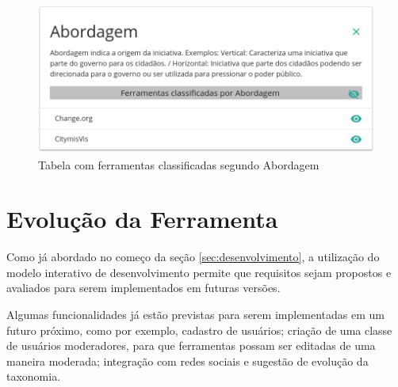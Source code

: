 \begin{figure}[!ht]
    \centering
    \includegraphics[scale=0.20]{./figuras/abordagem.png}
    \caption{Tabela com ferramentas classificadas segundo Abordagem}
    \label{fig:tabela-ferramentas}
\end{figure}

\section{Evolução da Ferramenta}
\label{sec:evolucao-ferramenta}
Como já abordado no começo da seção \ref{sec:desenvolvimento}, a utilização do modelo interativo de desenvolvimento permite que requisitos sejam propostos e avaliados para serem
implementados em futuras versões.

\par
Algumas funcionalidades já estão previstas para serem implementadas em um futuro próximo, como por exemplo, cadastro de usuários; criação de uma classe de usuários moderadores,
para que ferramentas possam ser editadas de uma maneira moderada; integração com redes sociais e sugestão de evolução da taxonomia. 